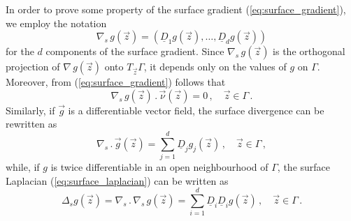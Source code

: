 In order to prove some property of the surface gradient
(\ref{eq:surface_gradient}), we employ the notation
\begin{equation}
\nabla_s \, g(\vec z) = (\underline{D}_1 g(\vec z), \hdots, \underline{D}_{d}
g(\vec z))
\end{equation}
for the $d$ components of the surface gradient. Since $\nabla_s \, g(\vec z)$
is the orthogonal projection of $\nabla \, g(\vec z)$ onto $T_{\vec z} \Gamma$,
it depends only on the values of $g$ on $\Gamma$. Moreover, from
(\ref{eq:surface_gradient}) follows that
\begin{equation}\label{eq:surface_gradient_comp}
\nabla_s \, g(\vec z) \,.\, \vec{\nu}(\vec z)=0\,, \quad \vec z \in \Gamma\,.
\end{equation}
Similarly, if $\vec g$ is a differentiable vector field, the surface divergence
can be rewritten as
\begin{equation}
\nabla_s \,.\, \vec g(\vec z) = \sum_{j = 1}^{d} \underline{D}_j g_j (\vec z)\,,
\quad \vec z \in \Gamma\,,
\end{equation}
while, if $g$ is twice differentiable in an open neighbourhood of
$\Gamma$, the surface Laplacian (\ref{eq:surface_laplacian}) can be written as
\begin{equation}\label{eq:surface_laplacian_comp}
\Delta_s g(\vec z) = \nabla_s\, . \,\nabla_s \, g(\vec z) =
\sum_{i = 1}^d \underline{D}_i \underline{D}_i g(\vec z) \, ,
\quad \vec z \in \Gamma \,.
\end{equation}


